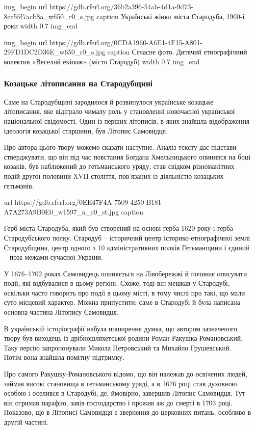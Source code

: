 \ifcmt
img_begin 
  url https://gdb.rferl.org/36b2a396-54ab-4d1a-9d73-8ce5fd7acb8a_w650_r0_s.jpg
  caption Українські жінки міста Стародуба, 1900-і роки
  width 0.7
img_end
\fi

\ifcmt
img_begin 
  url https://gdb.rferl.org/0CDA1960-A6E1-4F15-A801-29FD1DC2D36E_w650_r0_s.jpg
  caption Сечасне фото. Дитячий етнографічний колектив «Веселий екіпаж» (місто Стародуб)
  width 0.7
img_end
\fi

\subsubsection{Козацьке літописання на Стародубщині}

Саме на Стародубщині зародилося й розвинулося українське козацьке літописання,
яке відіграло чималу роль у становленні новочасної української національної
свідомості. Один із перших літописів, в яких знайшла відображення ідеологія
козацької старшини, був Літопис Самовидця.

Про автора цього твору можемо сказати наступне. Аналіз тексту дає підстави
стверджувати, що він під час повстання Богдана Хмельницького опинився на боці
козаків, був наближений до гетьманського уряду, став свідком різноманітних
подій другої половини XVII століття, пов’язаних із діяльністю козацьких
гетьманів.

url https://gdb.rferl.org/0EE47F4A-7509-4250-B181-A7A273A9B0E0_w1597_n_r0_st.jpg
caption 

Герб міста Стародуба, який був створений на основі герба 1620 року і герба
Стародубського полку. Стародуб – історичний центр історико-етнографічної землі
Стародубщина, центр одного з 10 адміністративних полків Гетьманщини і єдиний –
поза межами сучасної України.

У 1676–1702 роках Самовидець опиняється на Лівобережжі й починає описувати
події, які відбувалися в цьому регіоні. Схоже, тоді він мешкав у Стародубі,
оскільки часто говорить про події в цьому місті, в тому числі про такі, що мали
суто місцевий характер. Можна припустити: саме в Стародубі й була написана
основна частина Літопису Самовидця.

В українській історіографії набула поширення думка, що автором зазначеного
твору був виходець із дрібношляхетської родини Роман Ракушка-Романовський. Таку
версію запропонували Микола Петровський та Михайло Грушевський. Потім вона
знайшла помітну підтримку.

Про самого Ракушку-Романовського відомо, що він належав до освічених людей,
займав високі становища в гетьманському уряді, а в 1676 році став духовною
особою і оселився в Стародубі, де, ймовірно, завершив Літопис Самовидця. Тут
він отримав парафію, завів господарство і прожив аж до смерті в 1703 році.
Показово, що в Літописі Самовидця є звернення до церковних питань, особливо в
другій частині.

